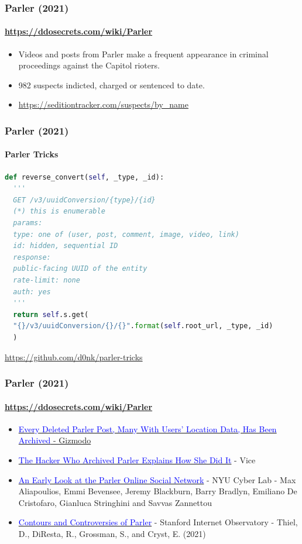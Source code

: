 \documentclass[aspectratio=169,usenames,dvipsnames]{beamer}
\begin{document}
\begin{frame}
  \frametitle{Parler (2021)}
  \framesubtitle{\url{https://ddosecrets.com/wiki/Parler}}

  \begin{itemize}[<+->]
    \item Videos and posts from Parler make a frequent appearance in criminal
      proceedings against the Capitol rioters.
    \item 982 suspects indicted, charged or sentenced to date.
    \item \url{https://seditiontracker.com/suspects/by_name}
  \end{itemize}

\end{frame}

\begin{frame}[fragile]
  \frametitle{Parler (2021)}
  \framesubtitle{Parler Tricks}

  \begin{lstlisting}[language=Python,basicstyle=\scriptsize,commentstyle=\color{Brown}]
  def reverse_convert(self, _type, _id):
  '''
  GET /v3/uuidConversion/{type}/{id}
  (*) this is enumerable
  params:
  type: one of (user, post, comment, image, video, link)
  id: hidden, sequential ID
  response:
  public-facing UUID of the entity
  rate-limit: none
  auth: yes
  '''
  return self.s.get(
  "{}/v3/uuidConversion/{}/{}".format(self.root_url, _type, _id)
  )
  \end{lstlisting}

  \centering
  \footnotesize
  \url{https://github.com/d0nk/parler-tricks}

\end{frame}

\begin{frame}
  \frametitle{Parler (2021)}
  \framesubtitle{\url{https://ddosecrets.com/wiki/Parler}}

  \begin{itemize}
    \item
      \href{https://gizmodo.com/every-deleted-parler-post-many-with-users-location-dat-1846032466}{\textcolor{blue}{Every
      Deleted Parler Post, Many With Users' Location Data, Has Been Archived}
      - Gizmodo}
    \item
      \href{https://www.vice.com/en/article/n7vqew/the-hacker-who-archived-parler-explains-how-she-did-it-and-what-comes-next}{\textcolor{blue}{The
      Hacker Who Archived Parler Explains How She Did It}} - Vice
    \item \href{https://arxiv.org/pdf/2101.03820.pdf}{\textcolor{blue}{An
      Early Look at the Parler Online Social Network}} - NYU Cyber Lab - Max
      Aliapoulios, Emmi Bevensee, Jeremy Blackburn, Barry Bradlyn, Emiliano De
      Cristofaro, Gianluca Stringhini and Savvas Zannettou
    \item
      \href{https://stacks.stanford.edu/file/druid:gw857tq5527/20210128-parler.pdf}{\textcolor{blue}{Contours
      and Controversies of Parler}} - Stanford Internet Observatory - Thiel,
      D., DiResta, R., Grossman, S., and Cryst, E. (2021)
  \end{itemize}

\end{frame}
\end{document}
